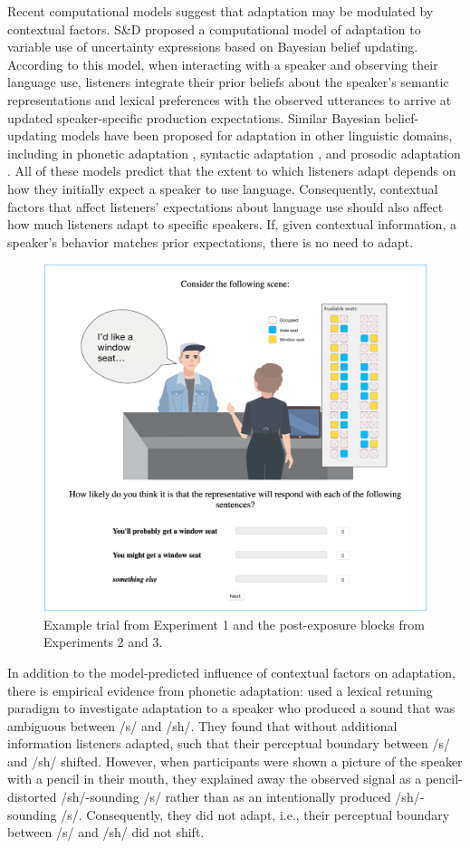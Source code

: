Recent computational models suggest that adaptation may be modulated by contextual factors. S\&D  proposed a computational model of adaptation to variable use of uncertainty expressions based on Bayesian belief updating. According to this model, when interacting with a speaker and observing their language use, listeners integrate their prior beliefs about the speaker's semantic representations and lexical preferences with the observed utterances to arrive at updated speaker-specific production expectations. Similar Bayesian belief-updating models have been proposed for adaptation in other linguistic domains, including in phonetic adaptation \cite{Kleinschmidt2015}, syntactic adaptation \cite{Kleinschmidt2012}, and prosodic adaptation \cite{Roettger2019}. All of these models predict that the extent to which listeners adapt depends on how they initially expect a speaker to use language. Consequently, contextual factors that affect listeners' expectations about language use should also affect how much listeners adapt to specific speakers. If, given contextual information, a speaker's behavior matches prior expectations, there is no need to adapt.

\begin{figure}
    \centering
    \includegraphics[width=0.9\columnwidth, trim={0 1cm 0 0cm}]{./plots/example-trial.png}
    \caption{Example trial from Experiment 1 and the post-exposure blocks from Experiments 2 and 3.}
    \label{fig:example-trial}
\end{figure}

In addition to the model-predicted influence of contextual factors on adaptation, there is  empirical evidence from phonetic adaptation: \textcite{Kraljic2008} used a lexical retuning paradigm to investigate adaptation to a speaker who produced a sound that was ambiguous between /s/ and /sh/. They found that without additional information listeners adapted, such that their perceptual boundary between /s/ and /sh/ shifted. However, when participants were shown a picture of the speaker with a pencil in their mouth, they explained away the observed signal as a pencil-distorted /sh/-sounding /s/ rather than as an intentionally produced /sh/-sounding /s/. Consequently, they did not adapt, i.e., their perceptual boundary between /s/ and /sh/ did not shift.


